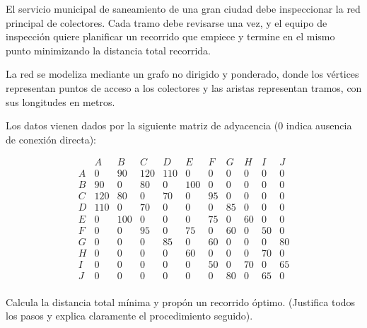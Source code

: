 El servicio municipal de saneamiento de una gran ciudad debe inspeccionar la red principal de colectores. Cada tramo debe revisarse una vez, y el equipo de inspección quiere planificar un recorrido que empiece y termine en el mismo punto minimizando la distancia total recorrida.

La red se modeliza mediante un grafo no dirigido y ponderado, donde los vértices representan puntos de acceso a los colectores y las aristas representan tramos, con sus longitudes en metros.

Los datos vienen dados por la siguiente matriz de adyacencia (0 indica ausencia de conexión directa):

\[
\begin{array}{c|cccccccccc}
 & A & B & C & D & E & F & G & H & I & J \\
\hline
A & 0 & 90 & 120 & 110 & 0 & 0 & 0 & 0 & 0 & 0 \\
B & 90 & 0 & 80 & 0 & 100 & 0 & 0 & 0 & 0 & 0 \\
C & 120 & 80 & 0 & 70 & 0 & 95 & 0 & 0 & 0 & 0 \\
D & 110 & 0 & 70 & 0 & 0 & 0 & 85 & 0 & 0 & 0 \\
E & 0 & 100 & 0 & 0 & 0 & 75 & 0 & 60 & 0 & 0 \\
F & 0 & 0 & 95 & 0 & 75 & 0 & 60 & 0 & 50 & 0 \\
G & 0 & 0 & 0 & 85 & 0 & 60 & 0 & 0 & 0 & 80 \\
H & 0 & 0 & 0 & 0 & 60 & 0 & 0 & 0 & 70 & 0 \\
I & 0 & 0 & 0 & 0 & 0 & 50 & 0 & 70 & 0 & 65 \\
J & 0 & 0 & 0 & 0 & 0 & 0 & 80 & 0 & 65 & 0 \\
\end{array}
\]

Calcula la distancia total mínima y propón un recorrido óptimo. (Justifica todos los pasos y explica claramente el procedimiento seguido).
